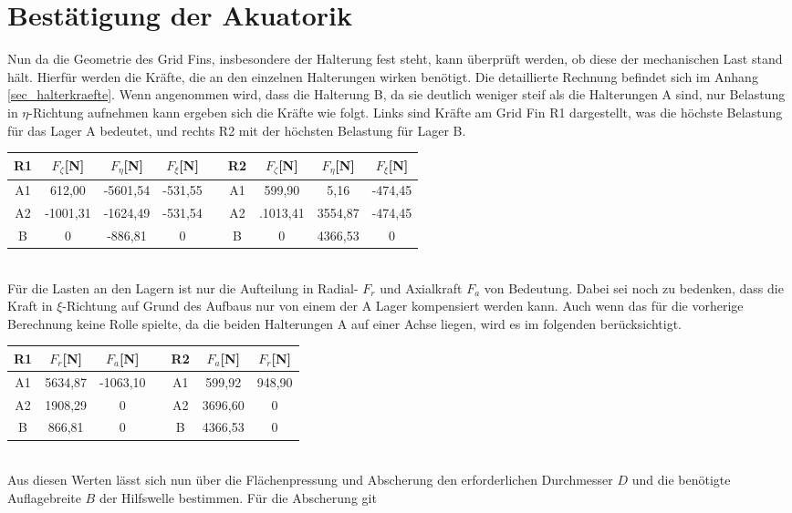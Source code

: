 \section{Bestätigung der Akuatorik}
Nun da die Geometrie des Grid Fins, insbesondere der Halterung fest steht, kann überprüft werden, ob diese der mechanischen Last stand hält. Hierfür werden die Kräfte, die an den einzelnen Halterungen wirken benötigt. Die detaillierte Rechnung befindet sich im Anhang \ref{sec_halterkraefte}. Wenn angenommen wird, dass die Halterung B, da sie deutlich weniger steif als die Halterungen A sind, nur Belastung in $\eta$-Richtung aufnehmen kann ergeben sich die Kräfte wie folgt. Links sind Kräfte am Grid Fin R1 dargestellt, was die höchste Belastung für das Lager A bedeutet, und rechts R2 mit der höchsten Belastung für Lager B.
\begin{table}[h] 
	\centering 
	\begin{tabular}{c|c|c|cc||c|c|c|c} 
		\textbf{R1}&$F_{\zeta}$[N]&$F_\eta$[N]&$F_\xi$[N]&&\textbf{R2}&$F_{\zeta}$[N]&$F_\eta$[N]&$F_\xi$[N]\\ 
		\hline 
		A1& 612,00&-5601,54&-531,55&&A1&599,90&5,16&-474,45\\
		A2&-1001,31&-1624,49&-531,54&&A2&.1013,41&3554,87&-474,45\\
		B&0&-886,81&0&&B&0&4366,53&0\\
	\end{tabular}
\end{table} \\
Für die Lasten an den Lagern ist nur die Aufteilung in Radial- $F_r$ und Axialkraft $F_a$ von Bedeutung. Dabei sei noch zu bedenken, dass die Kraft in $\xi$-Richtung auf Grund des Aufbaus nur von einem der A Lager kompensiert werden kann. Auch wenn das für die vorherige Berechnung keine Rolle spielte, da die beiden Halterungen A auf einer Achse liegen, wird es im folgenden berücksichtigt.
\begin{table}[h] 
	\centering 
	\begin{tabular}{c|c|cc||c|c|c} 
		\textbf{R1}&$F_{r}$[N]&$F_a$[N]&&\textbf{R2}&$F_{a}$[N]&$F_r$[N]\\ 
		\hline 
		A1& 5634,87&-1063,10&&A1&599,92&948,90\\
		A2&1908,29&0&&A2&3696,60&0\\
		B&866,81&0&&B&4366,53&0\\
	\end{tabular}
\end{table} \\
Aus diesen Werten lässt sich nun über die Flächenpressung und Abscherung den erforderlichen Durchmesser $D$ und die benötigte Auflagebreite $B$ der Hilfswelle bestimmen. Für die Abscherung git
